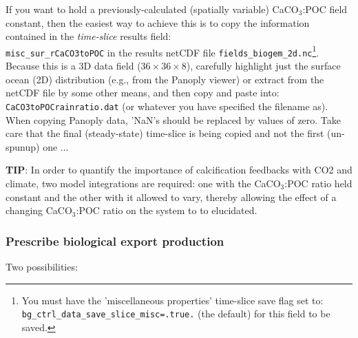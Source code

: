 \documentclass[11pt,fleqn]{book} %
\begin{document}
If you want to hold a previously-calculated (spatially variable) CaCO\begin{math}_3\end{math}:POC field constant, then the easiest way to achieve this is to copy the information contained in the \textit{time-slice} results field:\\
\texttt{misc\_sur\_rCaCO3toPOC} in the results netCDF file \texttt{fields\_biogem\_2d.nc}\footnote{You must have the 'miscellaneous properties' time-slice save flag set to:\\
\texttt{bg\_ctrl\_data\_save\_slice\_misc=.true.} (the default) for this field to be saved.}. Because this is a 3D data field (\begin{math}36\times36\times8\end{math}), carefully highlight just the surface ocean (2D) distribution (e.g., from the Panoply viewer) or extract from the netCDF file by some other means, and then copy and paste into:\\
\texttt{CaCO3toPOCrainratio.dat} (or whatever you have specified the filename as). When copying Panoply data, 'NaN's should be replaced by values of zero. Take care that the final (steady-state) time-slice is being copied and not the first (un-spunup) one ...

\textbf{TIP}: In order to quantify the importance of calcification feedbacks with CO2 and climate, two model integrations are required: one with the CaCO\begin{math}_3\end{math}:POC ratio held constant and the other with it allowed to vary, thereby allowing the effect of a changing CaCO\begin{math}_3\end{math}:POC ratio on the system to to elucidated.

%
\subsubsection{Prescribe biological export production}
\vspace{1mm}

Two possibilities:
\end{document}
